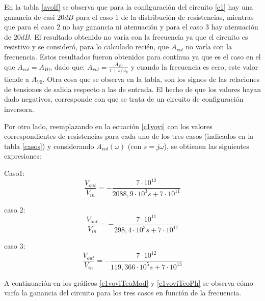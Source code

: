 En la tabla \ref{avolf} se observa que para la configuraci\'on del circuito \ref{c1} hay una ganancia de casi $20dB$ para el caso 1 de la distribuci\'on de resistencias, mientras que para el caso 2 no hay ganancia ni atenuaci\'on y para el caso 3 hay atenuaci\'on de $20dB$.  El resultado obtenido
no var\'ia con la frecuencia ya que el circuito es resistivo y se consider\'o,
para lo calculado reci\'en, que $A_{vol}$ no var\'ia con la frecuencia. Estos resultados
fueron obtenidos para cont\'inua ya que es el caso en el que $A_{vol}=A_{V0}$,
dado que: $A_{vol} = \frac{A_{V0}}{1+s/\omega_p} $ y cuando la frecuencia es cero,
este valor tiende a $A_{V0}$. Otra cosa que se observa en la tabla, son los signos de las relaciones de tensiones de salida respecto a las de entrada. El hecho de que los valores hayan dado negativos, corresponde con que se trata de un circuito de configuraci\'on inversora.


Por otro lado, reemplazando en la ecuaci\'on \ref{c1vovi} con los valores
 correspondientes de resistencias para cada uno de los tres casos
  (indicados en la tabla \ref{casos}) y considerando
   $A_{vol}(\omega)$ (con $s = j\omega$), se obtienen las siguientes expresiones:

Caso1:
\begin{equation}
	\frac{V_{out}}{V_{in}} = - \frac{7\cdot10^{12}}{2088,9 \cdot 10^3 s + 7 \cdot 10^{11}}
	\label{c1c1vovi}
\end{equation}

caso 2:
\begin{equation}
	\frac{V_{out}}{V_{in}} = - \frac{7 \cdot 10^{11}}{298,4 \cdot 10^{3} s +7 \cdot 10^{11}}
	\label{c1c2vovi}
\end{equation}

caso 3:
\begin{equation}
	\frac{V_{out}}{V_{in}} = - \frac{7 \cdot 10^{12}}{119,366 \cdot 10^{5} s +7 \cdot 10^{13}}
	\label{c1c3vovi}
\end{equation}

A continuaci\'on en los gr\'aficos \ref{c1voviTeoMod} y \ref{c1voviTeoPh} se observa c\'omo var\'ia la ganancia del circuito para los tres casos en funci\'on de la frecuencia.

